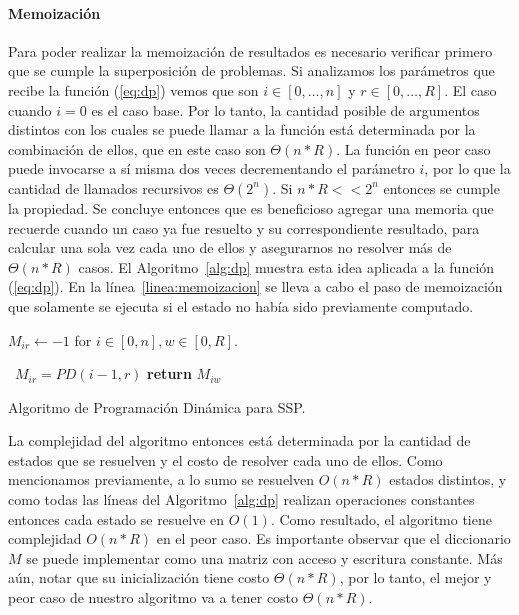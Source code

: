 \documentclass[10pt,a4paper]{article}
\begin{document}
\paragraph{Memoización}
Para poder realizar la memoización de resultados es necesario verificar primero que se cumple la superposición de problemas. Si analizamos los parámetros que recibe la función (\ref{eq:dp}) vemos que son $i \in [0, \hdots, n]$ y $r \in [0, \hdots, R]$. El caso cuando $i = 0$ es el caso base. Por lo tanto, la cantidad posible de argumentos distintos con los cuales se puede llamar a la función está determinada por la combinación de ellos, que en este caso son $\Theta(n * R)$. La función en peor caso puede invocarse a sí misma dos veces decrementando el parámetro $i$, por lo que la cantidad de llamados recursivos es $\Theta(2^n)$. Si $n*R << 2^n$ entonces se cumple la propiedad. 
Se concluye entonces que es beneficioso agregar una memoria que recuerde cuando un caso ya fue resuelto y su correspondiente resultado, para calcular una sola vez cada uno de ellos y asegurarnos no resolver más de $\Theta(n * R)$ casos. El Algoritmo~\ref{alg:dp} muestra esta idea aplicada a la función (\ref{eq:dp}). En la línea~\ref{linea:memoizacion} se lleva a cabo el paso de memoización que solamente se ejecuta si el estado no había sido previamente computado.

\begin{algorithm}
\begin{algorithmic}[1]
\State $M_{ir} \gets -1$ for $i \in [0, n], w \in [0, R]$.
    	
    	\
    		$M_{ir} = PD(i-1,r)$
    	\EndIf
    \EndIf
    \label{linea:memoizacion}
    \State \textbf{return} $M_{iw}$
\EndFunction
\end{algorithmic}
\caption{Algoritmo de Programación Dinámica para SSP.}
\label{alg:dp}
\end{algorithm}

La complejidad del algoritmo entonces está determinada por la cantidad de estados que se resuelven y el costo de resolver cada uno de ellos. Como mencionamos previamente, a lo sumo se resuelven $O(n * R)$ estados distintos, y como todas las líneas del Algoritmo~\ref{alg:dp} realizan operaciones constantes entonces cada estado se resuelve en $O(1)$. Como resultado, el algoritmo tiene complejidad $O(n*R)$ en el peor caso. Es importante observar que el diccionario $M$ se puede implementar como una matriz con acceso y escritura constante. Más aún, notar que su inicialización tiene costo $\Theta(n*R)$, por lo tanto, el mejor y peor caso de nuestro algoritmo va a tener costo $\Theta(n*R)$.
\end{document}
